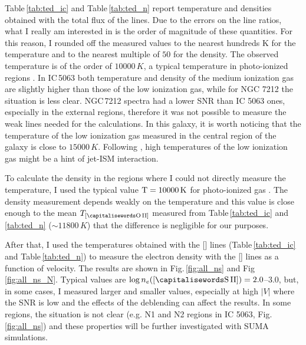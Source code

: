 \documentclass[../main.tex]{subfiles}
\begin{document}
Table\,\ref{tab:ted_ic} and Table\,\ref{tab:ted_n} report temperature and densities obtained with the total flux of the lines.
Due to the errors on the line ratios, what I really am interested in is the order of magnitude of these quantities.
For this reason, I rounded off the measured values to the nearest hundreds K for the temperature and to the nearest multiple of $50$ for the density.
The observed temperature is of the order of $10000\,\si{K}$, a typical temperature in photo-ionized regions \citep{OsterbrockAGN}.
In IC\,5063 both temperature and density of the medium ionization gas are slightly higher than those of the low ionization gas, while for NGC 7212 the situation is less clear.
NGC\,7212 spectra had a lower SNR than IC 5063 ones, especially in the external regions, therefore it was not possible to measure the weak lines needed for the calculations.
In this galaxy, it is worth noticing that the temperature of the low ionization gas measured in the central region of the galaxy is close to $15000\,\si{K}$. 
Following \citet{Roche16}, high temperatures of the low ionization gas might be a hint of jet-ISM interaction.

To calculate the density in the regions where I could not directly measure the temperature, I used the typical value $\rm{T} = 10000\,\si{K}$ for photo-ionized gas \citep{OsterbrockAGN}. 
The density measurement depends weakly on the temperature \citep{OsterbrockAGN} and this value is close enough to the mean $T_{[\rm \ion{O}{II}]}$ measured from Table\,\ref{tab:ted_ic} and \ref{tab:ted_n} ($\sim 11800\,\si{K}$) that the difference is negligible for our purposes.

After that, I used the temperatures obtained with the [] lines (Table\,\ref{tab:ted_ic} and Table\,\ref{tab:ted_n}) to measure the electron density with the [] lines as a function of velocity.
The results are shown in Fig.\,\ref{fig:all_ns} and Fig\,\ref{fig:all_ns_N}.
Typical values are $\log n_e([\rm\ion{S}{II}]) = 2.0$--$3.0$, but, in some cases, I measured larger and smaller values, especially at high $\lvert V \rvert$ where the SNR is low and the effects of the deblending can affect the results.
In some regions, the situation is not clear (e.g. N1 and N2 regions in IC 5063, Fig.\,\ref{fig:all_ns}) and these properties will be further investigated with SUMA simulations.
\end{document}
